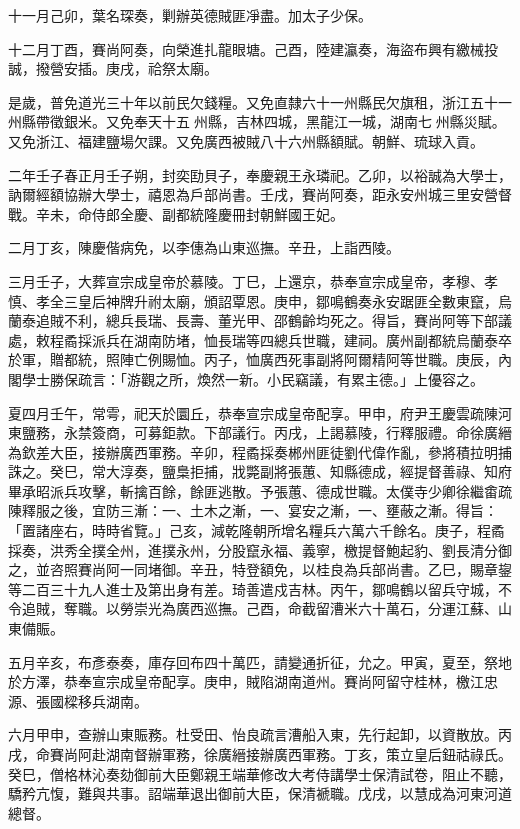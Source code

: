 \begin{pinyinscope}
十一月己卯，葉名琛奏，剿辦英德賊匪凈盡。加太子少保。

十二月丁酉，賽尚阿奏，向榮進扎龍眼塘。己酉，陸建瀛奏，海盜布興有繳械投誠，撥營安插。庚戌，祫祭太廟。

是歲，普免道光三十年以前民欠錢糧。又免直隸六十一州縣民欠旗租，浙江五十一州縣帶徵銀米。又免奉天十五州縣，吉林四城，黑龍江一城，湖南七州縣災賦。又免浙江、福建鹽場欠課。又免廣西被賊八十六州縣額賦。朝鮮、琉球入貢。

二年壬子春正月壬子朔，封奕劻貝子，奉慶親王永璘祀。乙卯，以裕誠為大學士，訥爾經額協辦大學士，禧恩為戶部尚書。壬戌，賽尚阿奏，距永安州城三里安營督戰。辛未，命侍郎全慶、副都統隆慶冊封朝鮮國王妃。

二月丁亥，陳慶偕病免，以李僡為山東巡撫。辛丑，上詣西陵。

三月壬子，大葬宣宗成皇帝於慕陵。丁巳，上還京，恭奉宣宗成皇帝，孝穆、孝慎、孝全三皇后神牌升祔太廟，頒詔覃恩。庚申，鄒鳴鶴奏永安踞匪全數東竄，烏蘭泰追賊不利，總兵長瑞、長壽、董光甲、邵鶴齡均死之。得旨，賽尚阿等下部議處，敕程矞採派兵在湖南防堵，恤長瑞等四總兵世職，建祠。廣州副都統烏蘭泰卒於軍，贈都統，照陣亡例賜恤。丙子，恤廣西死事副將阿爾精阿等世職。庚辰，內閣學士勝保疏言：「游觀之所，煥然一新。小民竊議，有累主德。」上優容之。

夏四月壬午，常雩，祀天於圜丘，恭奉宣宗成皇帝配享。甲申，府尹王慶雲疏陳河東鹽務，永禁簽商，可募鉅款。下部議行。丙戌，上謁慕陵，行釋服禮。命徐廣縉為欽差大臣，接辦廣西軍務。辛卯，程矞採奏郴州匪徒劉代偉作亂，參將積拉明捕誅之。癸巳，常大淳奏，鹽梟拒捕，戕斃副將張蕙、知縣德成，經提督善祿、知府畢承昭派兵攻擊，斬擒百餘，餘匪逃散。予張蕙、德成世職。太僕寺少卿徐繼畬疏陳釋服之後，宜防三漸：一、土木之漸，一、宴安之漸，一、壅蔽之漸。得旨：「置諸座右，時時省覽。」己亥，減乾隆朝所增名糧兵六萬六千餘名。庚子，程矞採奏，洪秀全撲全州，進撲永州，分股竄永福、義寧，檄提督鮑起豹、劉長清分御之，並咨照賽尚阿一同堵御。辛丑，特登額免，以桂良為兵部尚書。乙巳，賜章鋆等二百三十九人進士及第出身有差。琦善遣戍吉林。丙午，鄒鳴鶴以留兵守城，不令追賊，奪職。以勞崇光為廣西巡撫。己酉，命截留漕米六十萬石，分運江蘇、山東備賑。

五月辛亥，布彥泰奏，庫存回布四十萬匹，請變通折征，允之。甲寅，夏至，祭地於方澤，恭奉宣宗成皇帝配享。庚申，賊陷湖南道州。賽尚阿留守桂林，檄江忠源、張國樑移兵湖南。

六月甲申，查辦山東賑務。杜受田、怡良疏言漕船入東，先行起卸，以資散放。丙戌，命賽尚阿赴湖南督辦軍務，徐廣縉接辦廣西軍務。丁亥，策立皇后鈕祜祿氏。癸巳，僧格林沁奏劾御前大臣鄭親王端華修改大考侍講學士保清試卷，阻止不聽，驕矜亢愎，難與共事。詔端華退出御前大臣，保清褫職。戊戌，以慧成為河東河道總督。


\end{pinyinscope}

